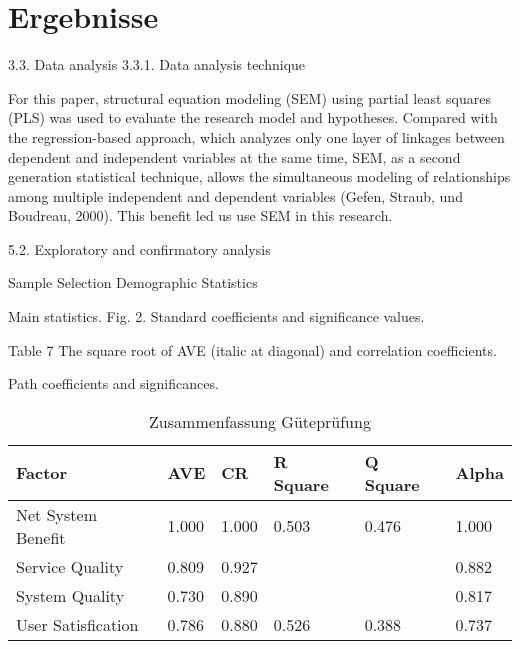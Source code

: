 \section{Ergebnisse}
\label{sec:ergebnisse}


3.3. Data analysis
3.3.1. Data analysis technique

For this paper, structural equation modeling (SEM) using partial least squares (PLS) was used to evaluate the research model and hypotheses. Compared with the regression-based approach, which analyzes only one layer of linkages between dependent and independent variables at the same time, SEM, as a second generation statistical technique, allows the simultaneous modeling of relationships among multiple independent and dependent variables (Gefen, Straub,  und Boudreau, 2000). This benefit led us use SEM in this research.

5.2. Exploratory and confirmatory analysis

Sample Selection
Demographic Statistics

Main statistics.
Fig. 2. Standard coefficients and significance values.

Table 7
The square root of AVE (italic at diagonal) and correlation coefficients.

Path coefficients and significances.












\begin{table}[h] 
\caption{Zusammenfassung G\"utepr\"ufung}
\label{tab:Zusammenfassung} 
\begin{tabular}{|l|l|l|l|l|l|}
  \hline
\textbf{Factor} & \textbf{AVE} & \textbf{CR} & \textbf{R Square} & \textbf{Q Square} & \textbf{Alpha} \\
  \hline
 Net System Benefit & 1.000 & 1.000 & 0.503 & 0.476 & 1.000 \\
  \hline 
 Service Quality & 0.809 & 0.927 & & & 0.882 \\
  \hline
 System Quality & 0.730 & 0.890 & & & 0.817 \\
  \hline
 User Satisfication & 0.786 & 0.880 & 0.526 & 0.388 & 0.737 \\ 
 \hline
\end{tabular}	
\end{table}



